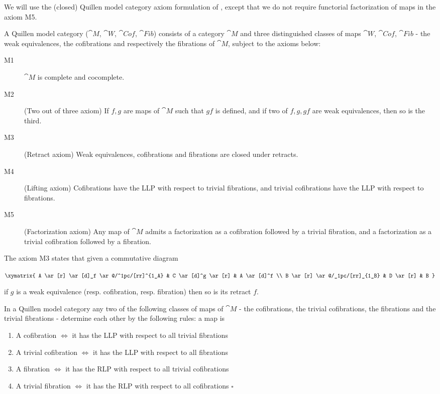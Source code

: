 We will use the (closed) Quillen model category axiom formulation of \cite{Hirschhorn}, except that we do not require functorial factorization of maps in the axiom M5. 

\begin{defn}
\label{defn:modelcat}
A Quillen model category (${\cat M}$, ${\cat W}$, ${\cat Cof}$, ${\cat Fib}$) consists of a category ${\cat M}$ and three distinguished classes of maps ${\cat W}$, ${\cat Cof}$, ${\cat Fib}$ - the weak equivalences, the cofibrations and respectively the fibrations of ${\cat M}$, subject to the axioms below:
\begin{description}
\item[M1] 
${\cat M}$ is complete and cocomplete. 
\item[M2] 
(Two out of three axiom) If $f, g$ are maps of ${\cat M}$ such that $gf$ is defined, and if two of $f, g, gf$ are weak equivalences, then so is the third.
\item[M3] 
(Retract axiom) Weak equivalences, cofibrations and fibrations are closed under retracts.
\item[M4]
(Lifting axiom) Cofibrations have the LLP with respect to trivial fibrations, and trivial cofibrations have the LLP with respect to fibrations.
\item[M5]
(Factorization axiom) Any map of ${\cat M}$ admits a factorization as a cofibration followed by a trivial fibration, and a factorization as a trivial cofibration followed by a fibration.
\end{description}
\end{defn}

The axiom M3 states that given a commutative diagram
\begin{center}
$\xymatrix{
	A \ar[r] \ar[d]_f \ar@/^1pc/[rr]^{1_A} &
	C \ar[d]^g \ar[r] & A \ar[d]^f \\
	B \ar[r] \ar@/_1pc/[rr]_{1_B} &
	D \ar[r] & B
	}$
\end{center}
if $g$ is a weak equivalence (resp. cofibration, resp. fibration) then so is its retract $f$.

\begin{prop}
\label{prop:llpcharact}
In a Quillen model category any two of the following classes of maps of ${\cat M}$ - the cofibrations, the trivial cofibrations, the fibrations and the trivial fibrations - determine each other by the following rules: a map is
\begin{enumerate}
\item
A cofibration $\Leftrightarrow$ it has the LLP with respect to all trivial fibrations
\item
A trivial cofibration $\Leftrightarrow$ it has the LLP with respect to all fibrations
\item
A fibration $\Leftrightarrow$ it has the RLP with respect to all trivial cofibrations
\item
A trivial fibration $\Leftrightarrow$ it has the RLP with respect to all cofibrations $\square$
\end{enumerate}
\end{prop}

